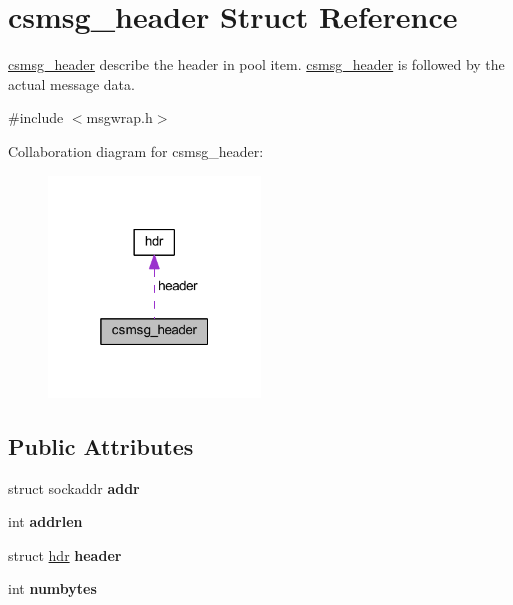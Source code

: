 \hypertarget{structcsmsg__header}{}\section{csmsg\+\_\+header Struct Reference}
\label{structcsmsg__header}


\hyperlink{structcsmsg__header}{csmsg\+\_\+header} describe the header in pool item. \hyperlink{structcsmsg__header}{csmsg\+\_\+header} is followed by the actual message data.  




{\ttfamily \#include $<$msgwrap.\+h$>$}



Collaboration diagram for csmsg\+\_\+header\+:
\nopagebreak
\begin{figure}[H]
\begin{center}
\leavevmode
\includegraphics[width=160pt]{structcsmsg__header__coll__graph}
\end{center}
\end{figure}
\subsection*{Public Attributes}
\begin{DoxyCompactItemize}
\item 
\hypertarget{structcsmsg__header_aa250b3612f8722982b2418ebc173ac07}{}struct sockaddr {\bfseries addr}\label{structcsmsg__header_aa250b3612f8722982b2418ebc173ac07}

\item 
\hypertarget{structcsmsg__header_aaf0f1d34d725622d45ebcd83de7eb98c}{}int {\bfseries addrlen}\label{structcsmsg__header_aaf0f1d34d725622d45ebcd83de7eb98c}

\item 
\hypertarget{structcsmsg__header_afe5ffaa8a10ca3c8f7ab9fc1d9e33326}{}struct \hyperlink{structhdr}{hdr} {\bfseries header}\label{structcsmsg__header_afe5ffaa8a10ca3c8f7ab9fc1d9e33326}

\item 
\hypertarget{structcsmsg__header_a341e25526736f6805d4b4b29c088da73}{}int {\bfseries numbytes}\label{structcsmsg__header_a341e25526736f6805d4b4b29c088da73}

\end{DoxyCompactItemize}


